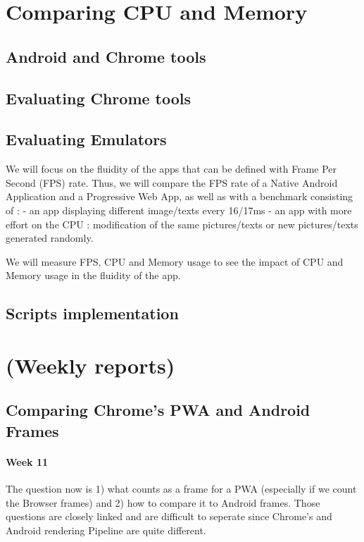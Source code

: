 \documentclass{kththesis}
\begin{document}
\section{Comparing CPU and Memory}
    \subsection{Android and Chrome tools}
    \subsection{Evaluating Chrome tools}
    \subsection{Evaluating Emulators}

We will focus on the fluidity of the apps that can be defined with Frame Per Second (FPS) rate.
Thus, we will compare the FPS rate of a Native Android Application and a Progressive Web App, as well as with a benchmark consisting of : 
    - an app displaying different image/texts every 16/17ms
    - an app with more effort on the CPU : modification of the same pictures/texts or new pictures/texts generated randomly.
\newline

We will measure FPS, CPU and Memory usage to see the impact of CPU and Memory usage in the fluidity of the app.
\newline

\subsection{Scripts implementation}

\iffalse
\section{(Weekly reports)}
\subsection{Comparing Chrome's PWA and Android Frames}
\paragraph{Week 11}
The question now is 1) what counts as a frame for a PWA (especially if we count the Browser frames) and 2) how to compare it to Android frames.
Those questions are closely linked and are difficult to seperate since Chrome's and Android rendering Pipeline are quite different.
\end{document}
